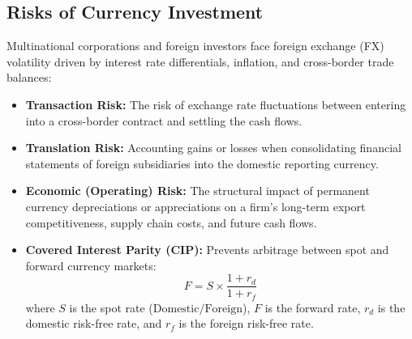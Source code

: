 \subsection{Risks of Currency Investment}

Multinational corporations and foreign investors face foreign exchange (FX) volatility driven by interest rate differentials, inflation, and cross-border trade balances:
\begin{itemize}[leftmargin=1.5em, itemsep=2pt]
    \item \textbf{Transaction Risk:} The risk of exchange rate fluctuations between entering into a cross-border contract and settling the cash flows.
    \item \textbf{Translation Risk:} Accounting gains or losses when consolidating financial statements of foreign subsidiaries into the domestic reporting currency.
    \item \textbf{Economic (Operating) Risk:} The structural impact of permanent currency depreciations or appreciations on a firm's long-term export competitiveness, supply chain costs, and future cash flows.
    \item \textbf{Covered Interest Parity (CIP):} Prevents arbitrage between spot and forward currency markets:
    \begin{equation}
    F = S \times \frac{1 + r_d}{1 + r_f}
    \end{equation}
    where $S$ is the spot rate ($\text{Domestic}/\text{Foreign}$), $F$ is the forward rate, $r_d$ is the domestic risk-free rate, and $r_f$ is the foreign risk-free rate.
\end{itemize}

